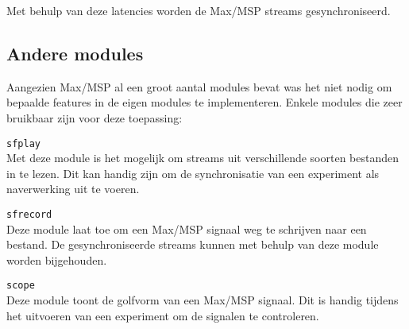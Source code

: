 Met behulp van deze latencies worden de Max/MSP streams gesynchroniseerd.

\subsection{Andere modules}

Aangezien Max/MSP al een groot aantal modules bevat was het niet nodig om bepaalde features in de eigen modules te implementeren. Enkele modules die zeer bruikbaar zijn voor deze toepassing:

\begin{description}
	\item\texttt{sfplay\textapprox} \hfill \\
	Met deze module is het mogelijk om streams uit verschillende soorten bestanden in te lezen. Dit kan handig zijn om de synchronisatie van een experiment als naverwerking uit te voeren.
	
	\item\texttt{sfrecord\textapprox} \hfill \\
	Deze module laat toe om een Max/MSP signaal weg te schrijven naar een bestand. De gesynchroniseerde streams kunnen met behulp van deze module worden bijgehouden.
	
	\item\texttt{scope\textapprox} \hfill \\
	Deze module toont de golfvorm van een Max/MSP signaal. Dit is handig tijdens het uitvoeren van een experiment om de signalen te controleren.
	
\end{description}


